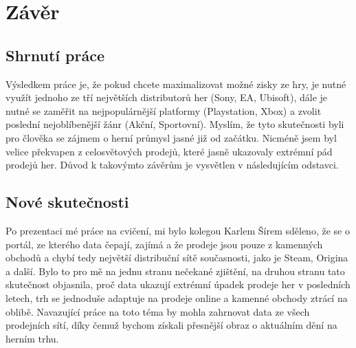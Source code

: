 \documentclass[FM,ZP]{tulthesis}
\begin{document}
\chapter{Závěr}

\section{Shrnutí práce}
Výsledkem práce je, že pokud chcete maximalizovat možné zisky ze hry, je nutné využít jednoho ze tří největších distributorů her (Sony, EA, Ubisoft), dále je nutné se zaměřit na nejpopulárnější platformy (Playstation, Xbox) a zvolit poslední nejoblíbenější žánr (Akční, Sportovní). Myslím, že tyto skutečnosti byli pro člověka se zájmem o herní průmysl jasné již od začátku. Nicméně jsem byl velice překvapen z celosvětových prodejů, které jasně ukazovaly extrémní pád prodejů her. Důvod k takovýmto závěrům je vysvětlen v následujícím odstavci.

\section{Nové skutečnosti}
Po prezentaci mé práce na cvičení, mi bylo kolegou Karlem Šírem sděleno, že se o portál, ze kterého data čepají, zajímá a že prodeje jsou pouze z kamenných obchodů a chybí tedy největší distribuční sítě současnosti, jako je Steam, Origina a další. Bylo to pro mě na jednu stranu nečekané zjištění, na druhou stranu tato skutečnost objasnila, proč data ukazují extrémní úpadek prodeje her v posledních letech, trh se jednoduše adaptuje na prodeje online a kamenné obchody ztrácí na oblibě. Navazující práce na toto téma by mohla zahrnovat data ze všech prodejních sítí, díky čemuž bychom získali přesnější obraz o aktuálním dění na herním trhu.
\end{document}
